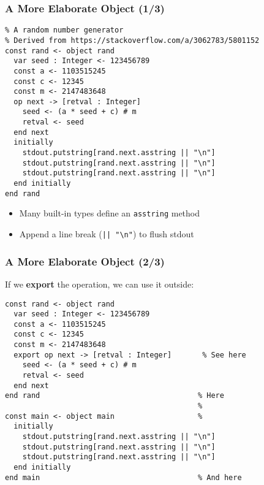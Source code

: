 \begin{frame}[fragile]

\frametitle{A More Elaborate Object (1/3)}

\begin{lstlisting}
% A random number generator
% Derived from https://stackoverflow.com/a/3062783/5801152
const rand <- object rand
  var seed : Integer <- 123456789
  const a <- 1103515245
  const c <- 12345
  const m <- 2147483648
  op next -> [retval : Integer]
    seed <- (a * seed + c) # m
    retval <- seed
  end next
  initially
    stdout.putstring[rand.next.asstring || "\n"]
    stdout.putstring[rand.next.asstring || "\n"]
    stdout.putstring[rand.next.asstring || "\n"]
  end initially
end rand
\end{lstlisting}

\begin{itemize}

\item Many built-in types define an \texttt{asstring} method

\item Append a line break (\lstinline{|| "\n"}) to flush stdout

\end{itemize}

\end{frame}

\begin{frame}[fragile]

\frametitle{A More Elaborate Object (2/3)}

If we \textbf{export} the operation, we can use it outside:

\begin{lstlisting}
const rand <- object rand
  var seed : Integer <- 123456789
  const a <- 1103515245
  const c <- 12345
  const m <- 2147483648
  export op next -> [retval : Integer]       % See here
    seed <- (a * seed + c) # m
    retval <- seed
  end next
end rand                                    % Here
                                            %
const main <- object main                   %
  initially
    stdout.putstring[rand.next.asstring || "\n"]
    stdout.putstring[rand.next.asstring || "\n"]
    stdout.putstring[rand.next.asstring || "\n"]
  end initially
end main                                    % And here
\end{lstlisting}

\end{frame}


